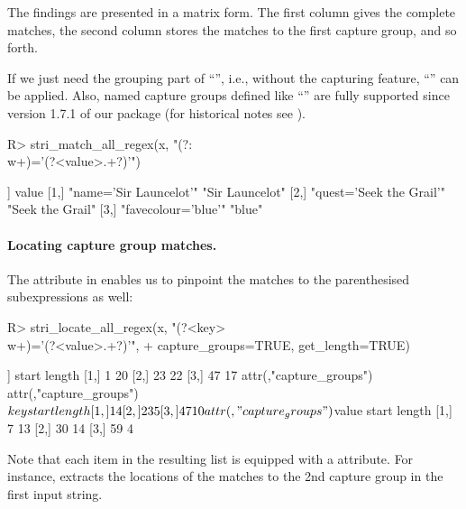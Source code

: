 \documentclass[nojss]{jss}
\begin{document}
The findings are presented in a matrix form. The first column
gives the complete matches, the second column stores the matches to the
first capture group, and so forth.


If we just need the grouping part of ``'', i.e.,
without the capturing feature,
``'' can be applied.
Also, named capture groups defined like
``'' are fully supported
since version 1.7.1 of our package (for historical notes see
\citealp{namedCapture}).

\begin{Schunk}
\begin{Sinput}
R> stri_match_all_regex(x, "(?:\\w+)='(?<value>.+?)'")
\end{Sinput}
\begin{Soutput}
[[1]]
                              value
[1,] "name='Sir Launcelot'"   "Sir Launcelot"
[2,] "quest='Seek the Grail'" "Seek the Grail"
[3,] "favecolour='blue'"      "blue"
\end{Soutput}
\end{Schunk}



\paragraph{Locating capture group matches.}
The  attribute in 
enables us to pinpoint the matches to the parenthesised subexpressions
as well:

\begin{Schunk}
\begin{Sinput}
R> stri_locate_all_regex(x, "(?<key>\\w+)='(?<value>.+?)'",
+    capture_groups=TRUE, get_length=TRUE)
\end{Sinput}
\begin{Soutput}
[[1]]
     start length
[1,]     1     20
[2,]    23     22
[3,]    47     17
attr(,"capture_groups")
attr(,"capture_groups")$key
     start length
[1,]     1      4
[2,]    23      5
[3,]    47     10

attr(,"capture_groups")$value
     start length
[1,]     7     13
[2,]    30     14
[3,]    59      4
\end{Soutput}
\end{Schunk}

\noindent
Note that each item in the resulting list
is equipped with a  attribute.
For instance,
extracts the locations of the matches to the 2nd capture group
in the first input string.
\end{document}
